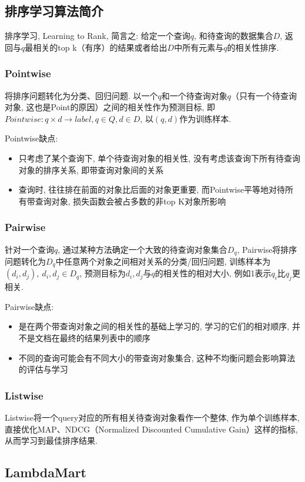 \subsection{排序学习算法简介}
排序学习, Learning to Rank, 简言之: 给定一个查询$q$, 和待查询的数据集合$D$, 返回与$q$最相关的top k（有序）的结果或者给出$D$中所有元素与$q$的相关性排序. 

\subsubsection{Pointwise}
将排序问题转化为分类、回归问题. 以一个$q$和一个待查询对象$q$（只有一个待查询对象, 这也是Point的原因）之间的相关性作为预测目标, 即$Pointwise: q \times d \rightarrow label, q \in Q, d \in D$, 以$(q, d)$作为训练样本. 

Pointwise缺点: 
\begin{itemize}
	\item 只考虑了某个查询下, 单个待查询对象的相关性, 没有考虑该查询下所有待查询对象的排序关系, 即带查询对象间的关系
	\item 查询时, 往往排在前面的对象比后面的对象更重要, 而Pointwise平等地对待所有带查询对象, 损失函数会被占多数的非top K对象所影响
\end{itemize}


\subsubsection{Pairwise}
针对一个查询$q$, 通过某种方法确定一个大致的待查询对象集合$D_q$, Pairwise将排序问题转化为$D_q$中任意两个对象之间相对关系的分类/回归问题, 训练样本为$(d_i, d_j),\: d_i, d_j \in D_q$, 预测目标为$d_i, d_j$与$q$的相关性的相对大小, 例如1表示$q_i$比$q_j$更相关. 

Pairwise缺点: 
\begin{itemize}
	\item 是在两个带查询对象之间的相关性的基础上学习的, 学习的它们的相对顺序, 并不是文档在最终的结果列表中的顺序
	\item 不同的查询可能会有不同大小的带查询对象集合, 这种不均衡问题会影响算法的评估与学习
\end{itemize}


\subsubsection{Listwise}
Listwise将一个query对应的所有相关待查询对象看作一个整体, 作为单个训练样本, 直接优化MAP、NDCG（Normalized Discounted Cumulative Gain）这样的指标, 从而学习到最佳排序结果. 


\subsection{LambdaMart}
